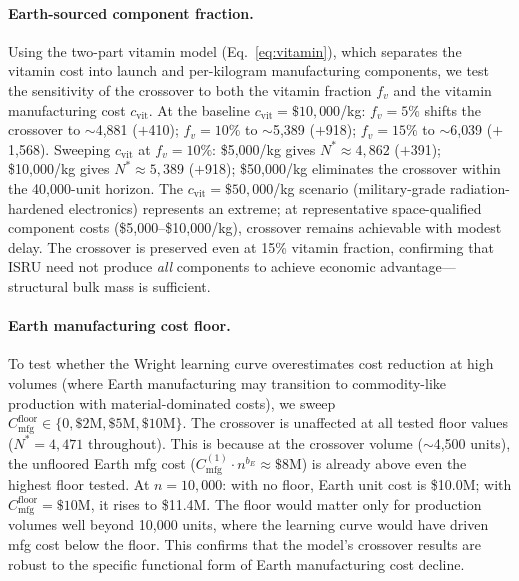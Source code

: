 \documentclass[preprint,12pt]{elsarticle}
\begin{document}
\paragraph{Earth-sourced component fraction.} Using the two-part vitamin model (Eq.~\ref{eq:vitamin}), which separates the vitamin cost into launch and per-kilogram manufacturing components, we test the sensitivity of the crossover to both the vitamin fraction $f_v$ and the vitamin manufacturing cost $c_{\mathrm{vit}}$. At the baseline $c_{\mathrm{vit}} = \$10{,}000$/kg: $f_v = 5\%$ shifts the crossover to $\sim$4{,}881 ($+$410); $f_v = 10\%$ to $\sim$5{,}389 ($+$918); $f_v = 15\%$ to $\sim$6{,}039 ($+$1{,}568). Sweeping $c_{\mathrm{vit}}$ at $f_v = 10\%$: \$5{,}000/kg gives $N^* \approx 4{,}862$ ($+$391); \$10{,}000/kg gives $N^* \approx 5{,}389$ ($+$918); \$50{,}000/kg eliminates the crossover within the 40{,}000-unit horizon. The $c_{\mathrm{vit}} = \$50{,}000$/kg scenario (military-grade radiation-hardened electronics) represents an extreme; at representative space-qualified component costs (\$5{,}000--\$10{,}000/kg), crossover remains achievable with modest delay. The crossover is preserved even at 15\% vitamin fraction, confirming that ISRU need not produce \emph{all} components to achieve economic advantage---structural bulk mass is sufficient.

\paragraph{Earth manufacturing cost floor.} To test whether the Wright learning curve overestimates cost reduction at high volumes (where Earth manufacturing may transition to commodity-like production with material-dominated costs), we sweep $C_{\mathrm{mfg}}^{\mathrm{floor}} \in \{0, \$2\text{M}, \$5\text{M}, \$10\text{M}\}$. The crossover is unaffected at all tested floor values ($N^* = 4{,}471$ throughout). This is because at the crossover volume ($\sim$4{,}500 units), the unfloored Earth mfg cost ($C_{\mathrm{mfg}}^{(1)} \cdot n^{b_E} \approx \$8$M) is already above even the highest floor tested. At $n = 10{,}000$: with no floor, Earth unit cost is \$10.0M; with $C_{\mathrm{mfg}}^{\mathrm{floor}} = \$10$M, it rises to \$11.4M. The floor would matter only for production volumes well beyond 10{,}000 units, where the learning curve would have driven mfg cost below the floor. This confirms that the model's crossover results are robust to the specific functional form of Earth manufacturing cost decline.
\end{document}
